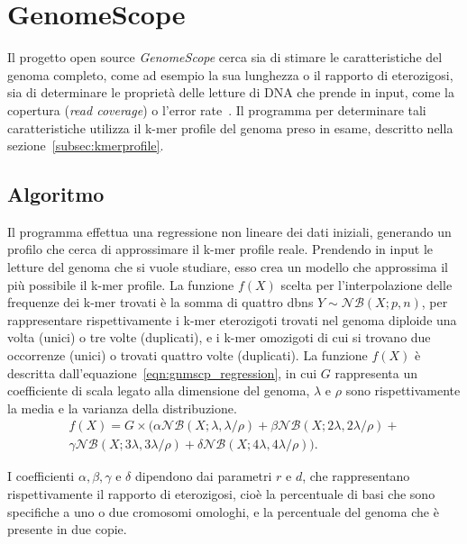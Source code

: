 \documentclass[crop=false, class=book]{standalone}
\begin{document}
	\section{GenomeScope}
	\label{sec:GenomeScope}
	Il progetto open source \textit{GenomeScope} cerca sia di stimare le caratteristiche del genoma completo, come ad esempio la sua lunghezza o il rapporto di eterozigosi, sia di determinare le proprietà delle letture di DNA che prende in input, come la copertura (\textit{read coverage}) o l'error rate~\cite{vurture2017genomescope}. Il programma per determinare tali caratteristiche utilizza il k-mer profile del genoma preso in esame, descritto nella sezione~\vref{subsec:kmerprofile}.
		
	\subsection{Algoritmo}
	Il programma effettua una regressione non lineare dei dati iniziali, generando un profilo che cerca di approssimare il k-mer profile reale. Prendendo in input le letture del genoma che si vuole studiare, esso crea un modello che approssima il più possibile il k-mer profile. La funzione $f(X)$ scelta per l'interpolazione delle frequenze dei k-mer trovati è la somma di quattro \glspl{dbn} $Y \sim \mathcal{NB}(X;p,n)$, per rappresentare rispettivamente i k-mer eterozigoti trovati nel genoma diploide una volta (unici) o tre volte (duplicati), e i k-mer omozigoti di cui si trovano due occorrenze (unici) o trovati quattro volte (duplicati). La funzione $f(X)$ è descritta dall'equazione~\vref{eqn:gnmscp_regression}, in cui $G$ rappresenta un coefficiente di scala legato alla dimensione del genoma, $\lambda$ e $\rho$ sono rispettivamente la media e la varianza della distribuzione.
	\begin{multline}
		f(X) = G \times (\alpha \mathcal{NB}(X;\lambda, \lambda/\rho) + \beta \mathcal{NB}(X;2\lambda, 2\lambda/\rho) + \\
		\gamma \mathcal{NB}(X;3\lambda, 3\lambda/\rho) + \delta \mathcal{NB}(X;4\lambda, 4\lambda/\rho)  ).	
		\label{eqn:gnmscp_regression}
	\end{multline}

	I coefficienti $\alpha, \beta, \gamma$ e $\delta$ dipendono dai parametri $r$ e $d$, che rappresentano rispettivamente il rapporto di eterozigosi, cioè la percentuale di basi che sono specifiche a uno o due cromosomi omologhi, e la percentuale del genoma che è presente in due copie.
	
\end{document}
